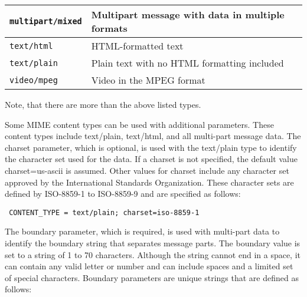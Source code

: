 \begin{description}
\begin{center}
\begin{longtable}{|l|p{8cm}|}
\verb|multipart/mixed| & Multipart message with data in multiple formats\\\hline
\verb|text/html| & HTML-formatted text\\\hline
\verb|text/plain| & Plain text with no HTML formatting included\\\hline
\verb|video/mpeg| & Video in the MPEG format\\\hline
\end{longtable}
\end{center}
Note, that there are more than the above listed types.

Some MIME content types can be used with additional parameters. These content
types include text/plain, text/html, and all multi-part message data. The
charset parameter, which is optional, is used with the text/plain type to
identify the character set used for the data. If a charset is not specified, the
default value charset=us-ascii is assumed. Other values for charset include any
character set approved by the International Standards Organization. These
character sets are defined by ISO-8859-1 to ISO-8859-9 and are specified as
follows:

{\footnotesize
\begin{verbatim}
 CONTENT_TYPE = text/plain; charset=iso-8859-1
\end{verbatim}
}

The boundary parameter, which is required, is used with multi-part data to
identify the boundary string that separates message parts. The boundary value is
set to a string of 1 to 70 characters. Although the string cannot end in a
space, it can contain any valid letter or number and can include spaces and a
limited set of special characters. Boundary parameters are unique strings that
are defined as follows:


\end{description}
